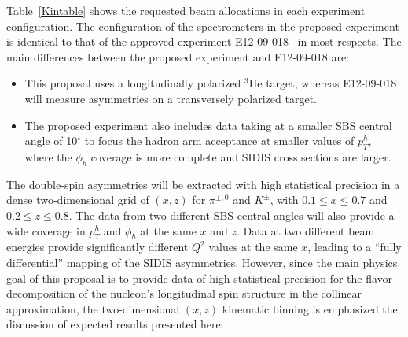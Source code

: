 Table~\ref{Kintable} shows the requested beam allocations in each experiment configuration. The configuration of the spectrometers in the proposed experiment is identical to that of the approved experiment E12-09-018~\cite{SBS_SIDIS} in most respects. The main differences between the proposed experiment and E12-09-018 are: 
\begin{itemize}
\item This proposal uses a longitudinally polarized $^3$He target, whereas E12-09-018 will measure asymmetries on a transversely polarized target. 
\item The proposed experiment also includes data taking at a smaller SBS central angle of 10$^\circ$ to focus the hadron arm acceptance at smaller values of $p_T^h$, where the $\phi_h$ coverage is more complete and SIDIS cross sections are larger. 
\end{itemize}
The double-spin asymmetries will be extracted with high statistical precision in a dense two-dimensional grid of $(x,z)$ for $\pi^{\pm,0}$ and $K^\pm$, with $0.1 \le x \le 0.7$ and $0.2 \le z \le 0.8$. The data from two different SBS central angles will also provide a wide coverage in $p_T^h$ and $\phi_h$ at the same $x$ and $z$. Data at two different beam energies provide significantly different $Q^2$ values at the same $x$, leading to a ``fully differential'' mapping of the SIDIS asymmetries. However, since the main physics goal of this proposal is to provide data of high statistical precision for the flavor decomposition of the nucleon's longitudinal spin structure in the collinear approximation, the two-dimensional $(x,z)$ kinematic binning is emphasized the discussion of expected results presented here.

